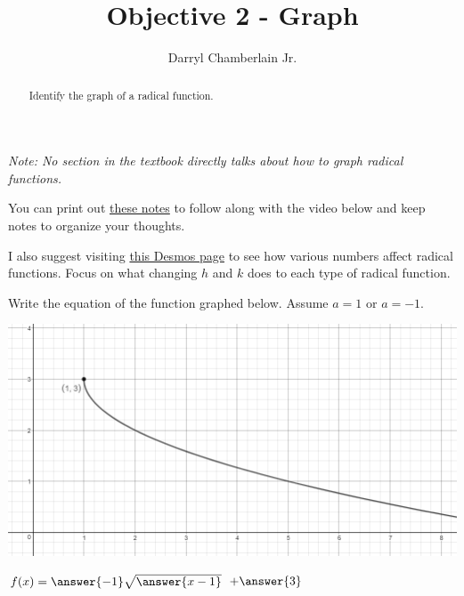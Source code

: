 \documentclass{ximera}
\author{Darryl Chamberlain Jr.}
\title{Objective 2 - Graph}
\begin{document}
\begin{abstract}
Identify the graph of a radical function.
\end{abstract}
\maketitle

\textit{Note: No section in the textbook directly talks about how to graph radical functions.}


You can print out \href{http://people.clas.ufl.edu/dchamberlain31/files/M5-Objective-2-Graph-Radical-Functions.pdf}{these notes} to follow along with the video below and keep notes to organize your thoughts.


I also suggest visiting \href{https://www.desmos.com/calculator/sa2j9mats1}{this Desmos page} to see how various numbers affect radical functions. Focus on what changing $h$ and $k$ does to each type of radical function.


\begin{question}
Write the equation of the function graphed below. Assume $a = 1$ or $a = -1$.  

\includegraphics{graphRadicalQ1.png}

$f(x) = \answer{-1} \sqrt{\answer{x-1}}$ $+ \answer{3}$ 

\end{question}
\end{document}
